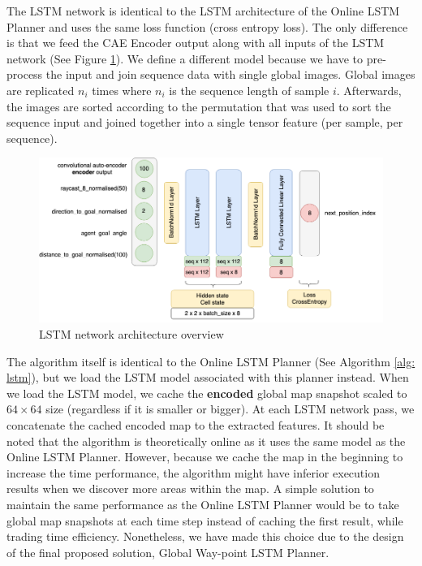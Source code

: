 The LSTM network is identical to the LSTM architecture of the Online LSTM Planner and uses the same loss function (cross entropy loss). The only difference is that we feed the CAE Encoder output along with all inputs of the LSTM network (See Figure \ref{fig:caelstm_section_lstm_kernel}). We define a different model because we have to pre-process the input and join sequence data with single global images. Global images are replicated $n_i$ times where $n_i$ is the sequence length of sample $i$. Afterwards, the images are sorted according to the permutation that was used to sort the sequence input and joined together into a single tensor feature (per sample, per sequence).

\begin{figure}[h!]
    \centerfloat
    \includegraphics[scale=0.45]{images/caelstm_section_lstm_kernel.png}
    \caption{LSTM network architecture overview}
    \label{fig:caelstm_section_lstm_kernel}
\end{figure}

The algorithm itself is identical to the Online LSTM Planner (See Algorithm \ref{alg: lstm}), but we load the LSTM model associated with this planner instead. When we load the LSTM model, we cache the \textbf{encoded} global map snapshot scaled to $64\times64$ size (regardless if it is smaller or bigger). At each LSTM network pass, we concatenate the cached encoded map to the extracted features. It should be noted that the algorithm is theoretically online as it uses the same model as the Online LSTM Planner. However, because we cache the map in the beginning to increase the time performance, the algorithm might have inferior execution results when we discover more areas within the map. A simple solution to maintain the same performance as the Online LSTM Planner would be to take global map snapshots at each time step instead of caching the first result, while trading time efficiency. Nonetheless, we have made this choice due to the design of the final proposed solution, Global Way-point LSTM Planner.


